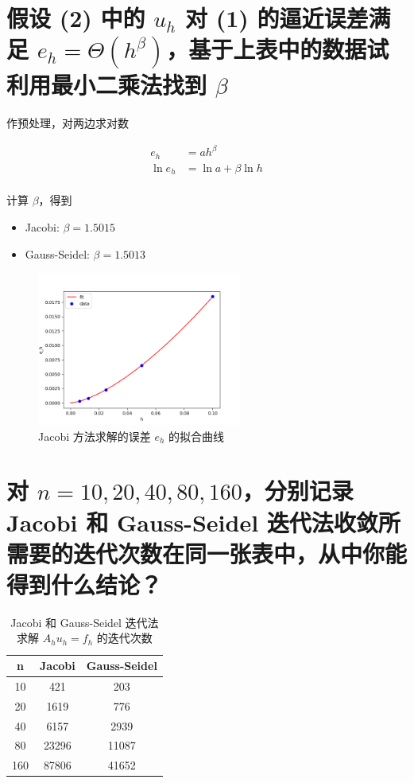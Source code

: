 \documentclass[a4paper,12pt]{ctexart}
\begin{document}
\section{假设 (2) 中的 $u_h$ 对 (1) 的逼近误差满足 $e_h = \Theta(h^\beta)$，基于上表中的数据试利用最小二乘法找到 $\beta$}


作预处理，对两边求对数

$$
\begin{aligned}
e_h &= a h^\beta \\
\ln e_h &= \ln a + \beta \ln h \\
\end{aligned}
$$

计算 $\beta$，得到



\begin{itemize}
    \setlength{\parskip}{0pt}
    \item Jacobi: $\beta = 1.5015$
    \item Gauss-Seidel: $\beta = 1.5013$
\end{itemize}

\begin{figure}[ht!]
\centering
\caption{Jacobi 方法求解的误差 $e_h$ 的拟合曲线}
\includegraphics[width=0.6\textwidth]{image/Jacobi.png}
\end{figure}




\section{对 $n = 10, 20, 40, 80, 160$，分别记录 Jacobi 和 Gauss-Seidel 迭代法收敛所需要的迭代次数在同一张表中，从中你能得到什么结论？}

\begin{table}[ht!]
\centering
\caption{Jacobi 和 Gauss-Seidel 迭代法求解 $A_h u_h = f_h$ 的迭代次数}
\begin{tabular}{|c|c|c|}
\hline
n       &   Jacobi     &   Gauss-Seidel  \\    \hline
10      &   421        &   203    \\
20      &   1619       &   776    \\
40      &   6157       &   2939   \\
80      &   23296      &   11087  \\
160     &   87806      &   41652  \\
\hline
\end{tabular}
\end{table}
\end{document}

